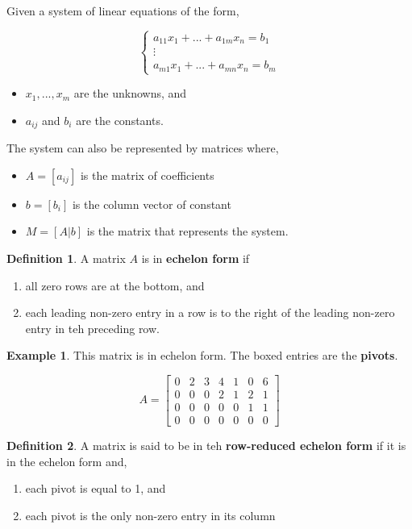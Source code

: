 \documentclass{report}
\theoremstyle{definition}
\newtheorem{_def}{Definition}
\newtheorem{ex}{Example}
\begin{document}
Given a system of linear equations of the form,

\[\left\{ 
  \begin{array}{c}
    a_{11}x_1+...+a_{1m}x_n=b_1 \\
    \vdots \\
    a_{m1}x_1+...+a_{mn}x_n=b_m
  \end{array} \right.\]

\begin{itemize}
 \item $x_1,...,x_m$ are the unknowns, and
 \item $a_{ij}$ and $b_i$ are the constants.
\end{itemize}

The system can also be represented by matrices where,

\begin{itemize}
 \item $A=[a_{ij}]$ is the matrix of coefficients
 \item $b=[b_i]$ is the column vector of constant
 \item $M=[A|b]$ is the matrix that represents the system.
\end{itemize}

\begin{_def}
A matrix $A$ is in \textbf{echelon form} if 
\begin{enumerate}
 \item all zero rows are at the bottom, and
 \item each leading non-zero entry in a row is to the right of the leading non-zero entry in teh preceding row.
\end{enumerate}
\end{_def}

\begin{ex}
This matrix is in echelon form.
The boxed entries are the \textbf{pivots}.

\[A=
\begin{bmatrix}
 0 & \boxed{2} & 3 & 4 & 1 & 0 & 6 \\
 0 & 0 & 0 & \boxed{2} & 1 & 2 & 1 \\
 0 & 0 & 0 & 0 & 0 & \boxed{1} & 1 \\
 0 & 0 & 0 & 0 & 0 & 0 & 0
\end{bmatrix}
\]
\end{ex}

\begin{_def}
A matrix is said to be in teh \textbf{row-reduced echelon form} if it is in the echelon form and,
\begin{enumerate}
 \item each pivot is equal to 1, and
 \item each pivot is the only non-zero entry in its column
\end{enumerate}
\end{_def}
\end{document}
